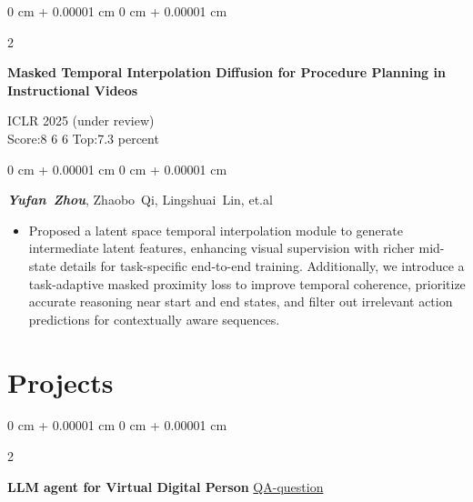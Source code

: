 \documentclass[10pt, letterpaper]{article}
\newenvironment{highlights}{
    \begin{itemize}[
        topsep=0.10 cm,
        parsep=0.10 cm,
        partopsep=0pt,
        itemsep=0pt,
        leftmargin=0 cm + 10pt
    ]
}{
    \end{itemize}
} %
\newenvironment{onecolentry}{
    \begin{adjustwidth}{
        0 cm + 0.00001 cm
    }{
        0 cm + 0.00001 cm
    }
}{
    \end{adjustwidth}
} %
\newenvironment{twocolentry}[2][]{
    \onecolentry
    \def\secondColumn{#2}
    \setcolumnwidth{\fill, 4.5 cm}
    \begin{paracol}{2}
}{
    \switchcolumn \raggedleft \secondColumn
    \end{paracol}
    \endonecolentry
} %
\begin{document}
        \begin{samepage}
            \begin{twocolentry}{
               ICLR 2025 (under review) \\
            Score:8 6 6 Top:7.3 percent
            }
                \textbf{Masked Temporal Interpolation Diffusion for Procedure Planning in Instructional Videos}
            \end{twocolentry}

            \vspace{0.10 cm}
            
            \begin{onecolentry}

                \mbox{\textbf{\textit{Yufan Zhou}}}, \mbox{Zhaobo Qi}, \mbox{Lingshuai Lin}, et.al

                \vspace{0.10 cm}
            \begin{highlights}
            
                \item Proposed a latent space temporal interpolation module to generate intermediate latent features, enhancing visual supervision with richer mid-state details for task-specific end-to-end training. Additionally, we introduce a task-adaptive masked proximity loss to improve temporal coherence, prioritize accurate reasoning near start and end states, and filter out irrelevant action predictions for contextually aware sequences.
            \end{highlights}
        
        \end{onecolentry}
        \end{samepage}

    \section{Projects}




        \begin{twocolentry}{
            \href{https://github.com/WiserZhou/QA-question}{QA-question}
        }
            \textbf{LLM agent for Virtual Digital Person}\end{twocolentry}
\end{document}
